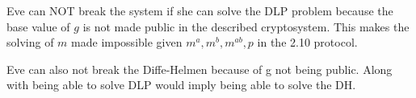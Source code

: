 \documentclass[10pt]{amsart}
\begin{document}
\begin{addmargin}{5pt}
Eve can NOT break the system if she can solve the DLP problem because the base 
value of $g$ is not made public in the described cryptosystem. This makes 
the solving of $m$ made impossible given $m^a, m^b, m^{ab}, p$ in the 2.10
protocol. 

Eve can also not break the Diffe-Helmen because of g not being public. Along
with being able to solve DLP would imply being able to solve the DH.\\

\end{addmargin}
\end{document}
